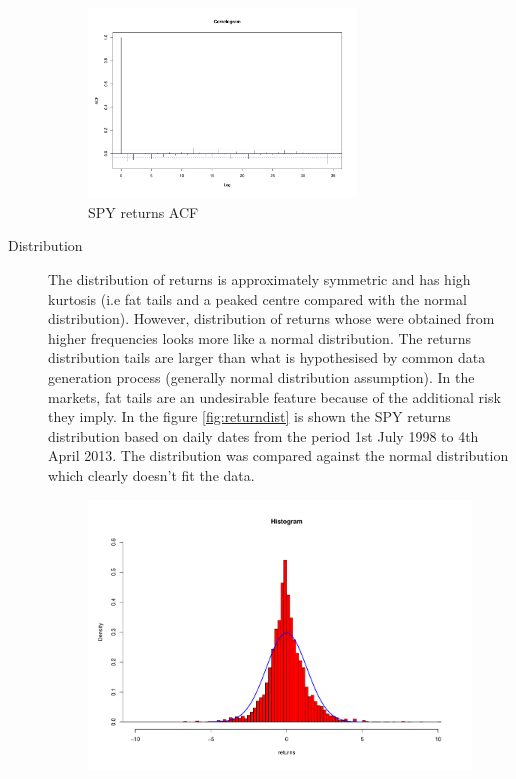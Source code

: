 \begin{description}
 \begin{figure}[h]
 \centering
 \includegraphics[width=0.7\textwidth]{plots/spy_returns_acf.pdf}
 \caption{SPY returns ACF}
 \label{fig:returnacf}
\end{figure}
\item[Distribution] The distribution of returns is approximately symmetric and
has high kurtosis (i.e fat tails and a peaked centre compared with the normal
distribution). However, distribution of returns whose were obtained from higher
frequencies looks more like a normal distribution.
The returns distribution tails are larger than
 what is hypothesised by common data generation process (generally normal
 distribution assumption). In the markets, fat tails are an undesirable feature
 because of the additional risk they imply.  In the figure \ref{fig:returndist}
 is shown the SPY returns distribution based on daily dates from the period 1st
 July 1998 to 4th April 2013. The distribution was compared against the normal
 distribution which clearly doesn't fit the data.  
 \begin{figure}[h]
 \centering
 \includegraphics[scale=0.5]{plots/spy_returns_dist.pdf}

\end{figure}
\end{description}
